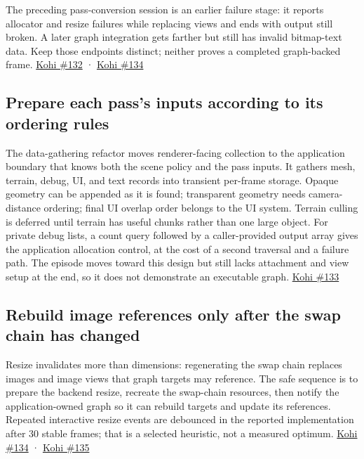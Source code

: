 The preceding pass-conversion session is an earlier failure stage: it reports allocator and resize failures while replacing views and ends with output still broken. A later graph integration gets farther but still has invalid bitmap-text data. Keep those endpoints distinct; neither proves a completed graph-backed frame. \href{https://www.youtube.com/watch?v=qxGXHap7GU0}{Kohi \#132} · \href{https://www.youtube.com/watch?v=AR6c1Bn57G4}{Kohi \#134}

\subsection{Prepare each pass's inputs according to its ordering rules}\label{06-engine-ii-ch026-prepare-each-passs-inputs-according-to-its-ordering-rules}

\hypertarget{06-engine-ii-ch026-prepare-each-passs-inputs-according-to-its-ordering-rules}{}

The data-gathering refactor moves renderer-facing collection to the application boundary that knows both the scene policy and the pass inputs. It gathers mesh, terrain, debug, UI, and text records into transient per-frame storage. Opaque geometry can be appended as it is found; transparent geometry needs camera-distance ordering; final UI overlap order belongs to the UI system. Terrain culling is deferred until terrain has useful chunks rather than one large object. For private debug lists, a count query followed by a caller-provided output array gives the application allocation control, at the cost of a second traversal and a failure path. The episode moves toward this design but still lacks attachment and view setup at the end, so it does not demonstrate an executable graph. \href{https://www.youtube.com/watch?v=wIdIXUnaIL0}{Kohi \#133}

\subsection{Rebuild image references only after the swap chain has changed}\label{06-engine-ii-ch026-rebuild-image-references-only-after-the-swap-chain-has-changed}

\hypertarget{06-engine-ii-ch026-rebuild-image-references-only-after-the-swap-chain-has-changed}{}

Resize invalidates more than dimensions: regenerating the swap chain replaces images and image views that graph targets may reference. The safe sequence is to prepare the backend resize, recreate the swap-chain resources, then notify the application-owned graph so it can rebuild targets and update its references. Repeated interactive resize events are debounced in the reported implementation after 30 stable frames; that is a selected heuristic, not a measured optimum. \href{https://www.youtube.com/watch?v=AR6c1Bn57G4}{Kohi \#134} · \href{https://www.youtube.com/watch?v=zdZP0uQ4Pi8}{Kohi \#135}

